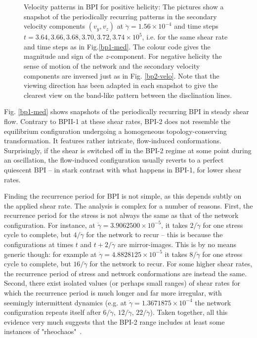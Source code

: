 \documentclass[8.5pt,twoside,twocolumn]{article}
\newcommand{\e}[1]{\times10^{#1}}
\newcommand{\gd}{\dot{\gamma}}
\begin{document}
\begin{figure}[htpb]
\caption{Velocity patterns in BPI for positive helicity: 
The pictures show a snapshot of the periodically recurring patterns in the 
secondary velocity components $(v_y,v_z)$ at $\gd=1.56\e{-4}$ and time steps 
$t=3.64, 3.66,3.68,3.70,3.72,3.74\e{5}$, i.e. for the same shear rate
and time steps as in Fig.\ref{bp1-med}. The colour code gives the magnitude and sign 
of the $z$-component. For negative helicity the sense of motion of the 
network and the secondary velocity components are inversed just as in Fig. \ref{bp2-velo}. 
Note that the viewing direction has been adapted in
each snapshot to give the clearest view on the band-like pattern between
the disclination lines.}
\label{bp1-velo}
\end{figure}

Fig. \ref{bp1-med} shows snapshots of the periodically recurring 
BPI in steady shear flow. Contrary to BPII-1 at these shear rates, 
BPI-2 does not resemble the equilibrium configuration
undergoing a homogeneous topology-conserving 
transformation. It features rather intricate, flow-induced 
conformations. Surprisingly, if the shear is switched off in
the BPI-2 regime at some point during an oscillation, 
the flow-induced configuration usually
reverts to a perfect quiescent BPI -- in stark contrast with
what happens in BPI-1, for lower shear rates. 

Finding the recurrence period for BPI is not simple, as
this depends subtly on the applied shear rate. The analysis is complex for
a number of reasons. 
First, the recurrence period for the stress is not always the same as
that of the network configuration. 
For instance, at $\gd=3.9062500\e{-5}$, it takes $2/\gd$ for one
 stress cycle to complete, but $4/\gd$ for the network to recur --
this is because the configurations at times $t$ and $t+2/\gd$ are 
mirror-images. This is by no means generic though: for example
at $\gd=4.8828125\e{-5}$  it takes $8/\gd$ for one
stress cycle to complete, but $16/\gd$ for the network to recur. 
For some higher shear rates, the recurrence period of stress
and network conformations are instead the same.
Second, there exist isolated values (or perhaps small ranges) of shear
rates for which the recurrence period is much longer and far more irregular,
with seemingly intermittent dynamics (e.g. at $\gd=1.3671875\e{-4}$ the
network configuration repeats itself after $6/\gd$, $12/\gd$, $22/\gd$).
Taken together, all this evidence very much suggests that 
the BPI-2 range includes at least some instances of "rheochaos"~\cite{rheochaos,Cates:2002}.
\end{document}
